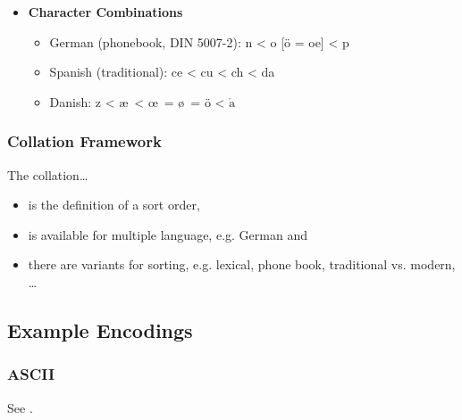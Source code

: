 \begin{itemize}
\begin{itemize}
                			\item French: c{\^o}te < cot{\'e}
                			\item English: cot{\'e} < c{\^o}te
                		\end{itemize}
                	\item \textbf{Character Combinations}
                		\begin{itemize}
                			\item German (phonebook, DIN 5007-2): n < o [ö = oe] < p
                			\item Spanish (traditional): ce < cu < ch < da
                			\item Danish: z < \ae \, < \! \oe \, = \o \, = ö < \(\mathring{\text{a}}\)
                		\end{itemize}
                \end{itemize}

            \subsubsection{Collation Framework} %
            	The collation\dots
                \begin{itemize}
                	\item is the definition of a sort order,
                	\item is available for multiple language, e.g. German and
                	\item there are variants for sorting, e.g. lexical, phone book, traditional vs. modern, \dots
                \end{itemize}

        \subsection{Example Encodings} %
            \subsubsection{ASCII} %
                See .

